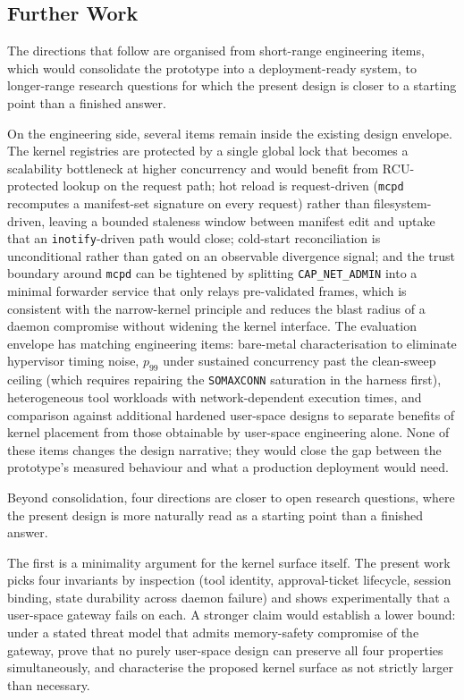 \subsection{Further Work}
\label{sec:further-work}

The directions that follow are organised from short-range engineering items, which would consolidate the prototype into a deployment-ready system, to longer-range research questions for which the present design is closer to a starting point than a finished answer.

On the engineering side, several items remain inside the existing design envelope.
The kernel registries are protected by a single global lock that becomes a scalability bottleneck at higher concurrency and would benefit from RCU-protected lookup on the request path; hot reload is request-driven (\texttt{mcpd} recomputes a manifest-set signature on every request) rather than filesystem-driven, leaving a bounded staleness window between manifest edit and uptake that an \texttt{inotify}-driven path would close; cold-start reconciliation is unconditional rather than gated on an observable divergence signal; and the trust boundary around \texttt{mcpd} can be tightened by splitting \texttt{CAP\_\allowbreak NET\_\allowbreak ADMIN} into a minimal forwarder service that only relays pre-validated frames, which is consistent with the narrow-kernel principle and reduces the blast radius of a daemon compromise without widening the kernel interface.
The evaluation envelope has matching engineering items: bare-metal characterisation to eliminate hypervisor timing noise, $p_{99}$ under sustained concurrency past the clean-sweep ceiling (which requires repairing the \texttt{SOMAXCONN} saturation in the harness first), heterogeneous tool workloads with network-dependent execution times, and comparison against additional hardened user-space designs to separate benefits of kernel placement from those obtainable by user-space engineering alone.
None of these items changes the design narrative; they would close the gap between the prototype's measured behaviour and what a production deployment would need.

Beyond consolidation, four directions are closer to open research questions, where the present design is more naturally read as a starting point than a finished answer.

The first is a minimality argument for the kernel surface itself.
The present work picks four invariants by inspection (tool identity, approval-ticket lifecycle, session binding, state durability across daemon failure) and shows experimentally that a user-space gateway fails on each.
A stronger claim would establish a lower bound: under a stated threat model that admits memory-safety compromise of the gateway, prove that no purely user-space design can preserve all four properties simultaneously, and characterise the proposed kernel surface as not strictly larger than necessary.

